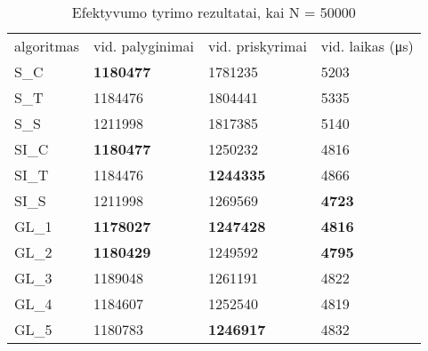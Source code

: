 \documentclass{VUMIFInfKursinis}
\begin{document}
\begin{table}[H]
  \caption{Efektyvumo tyrimo rezultatai, kai N = 50000}
  \label{results_50000}
  \centering
  \begin{tabular}{llll}
    algoritmas & vid. palyginimai                         & vid. priskyrimai                         & vid. laikas (μs)                      \\
    S\_C       & \cellcolor[HTML]{70AD47}\textbf{1180477} & 1781235                                  & 5203                                  \\
    S\_T       & 1184476                                  & 1804441                                  & 5335                                  \\
    S\_S       & 1211998                                  & 1817385                                  & 5140                                  \\
    SI\_C      & \cellcolor[HTML]{70AD47}\textbf{1180477} & 1250232                                  & 4816                                  \\
    SI\_T      & 1184476                                  & \cellcolor[HTML]{70AD47}\textbf{1244335} & 4866                                  \\
    SI\_S      & 1211998                                  & 1269569                                  & \cellcolor[HTML]{70AD47}\textbf{4723} \\
    GL\_1 & \cellcolor[HTML]{70AD47}\textbf{1178027} & \cellcolor[HTML]{70AD47}\textbf{1247428} & \cellcolor[HTML]{70AD47}\textbf{4816} \\
    GL\_2 & \cellcolor[HTML]{70AD47}\textbf{1180429} & 1249592                                  & \cellcolor[HTML]{70AD47}\textbf{4795} \\
    GL\_3      & 1189048                                  & 1261191                                  & 4822                                  \\
    GL\_4      & 1184607                                  & 1252540                                  & 4819                                  \\
    GL\_5      & 1180783                                  & \cellcolor[HTML]{70AD47}\textbf{1246917} & 4832                                 
  \end{tabular}
\end{table}
\end{document}
